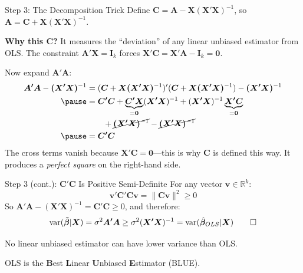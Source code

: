 \documentclass[aspectratio=169, handout]{beamer}
\numberwithin{equation}{section}
\begin{document}
\begin{frame}{Step 3: The Decomposition Trick}
Define $\bm{C}=\bm{A}-\bm{X(X'X)}^{-1}$, so $\bm{A}=\bm{C}+\bm{X(X'X)}^{-1}$.
\pause

\smallskip
\textbf{Why this $\bm{C}$?}  It measures the ``deviation'' of any linear unbiased estimator from OLS.  The constraint $\bm{A'X}=\bm{I}_k$ forces $\bm{X'C}=\bm{X'A}-\bm{I}_k=\bm{0}$.
\pause

\smallskip
Now expand $\bm{A'A}$:
\small
\begin{align*}
\bm{A'A}-\bm{(X'X)}^{-1}&=(\bm{C}+\bm{X(X'X)}^{-1})'(\bm{C}+\bm{X(X'X)}^{-1}) -\bm{(X'X)}^{-1}\\\pause
&=\bm{C'C}+\underbrace{\bm{C'X}}_{=\bm{0}}(\bm{X'X})^{-1}+(\bm{X'X})^{-1}\underbrace{\bm{X'C}}_{=\bm{0}}\\
&\qquad +\cancel{\bm{(X'X)}^{-1}}-\cancel{\bm{(X'X)}^{-1}} \\\pause
&=\bm{C'C}
\end{align*}
\normalsize
\pause
The cross terms vanish because $\bm{X'C}=\bm{0}$---this is why $\bm{C}$ is defined this way.  It produces a \emph{perfect square} on the right-hand side.
\end{frame}


\begin{frame}{Step 3 (cont.): $\bm{C'C}$ Is Positive Semi-Definite}
For any vector $\bm{v}\in\mathbb{R}^k$:
$$\bm{v}'\bm{C'C}\bm{v}=\|\bm{Cv}\|^2\geq 0$$
\pause
So $\bm{A'A}-(\bm{X'X})^{-1}=\bm{C'C}\geq 0$, and therefore:
$$\text{var}(\bm{\tilde{\beta}}|\bm{X})=\sigma^2\bm{A'A}\geq \sigma^2(\bm{X'X})^{-1}=\text{var}(\hat{\bm{\beta}}_{OLS}|\bm{X}) \qed$$
\pause

\medskip
No linear unbiased estimator can have lower variance than OLS.

OLS is the \textbf{B}est \textbf{L}inear \textbf{U}nbiased \textbf{E}stimator (BLUE).
\end{frame}
\end{document}
